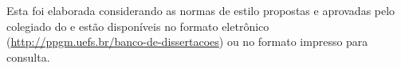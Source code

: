 
\begin{notaestilo}
Esta \thetypeworkthree foi elaborada considerando as normas de estilo propostas e aprovadas pelo colegiado do \thefacultytwo e est\~ao dispon\'iveis no formato eletr\^onico (\url{http://ppgm.uefs.br/banco-de-dissertacoes}) ou no formato impresso para consulta. \\


\end{notaestilo}
